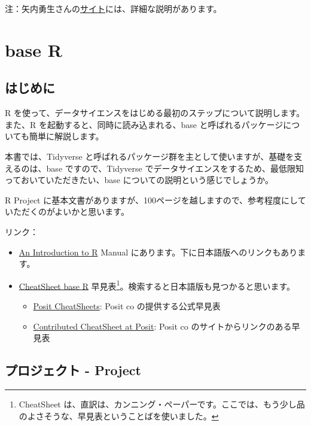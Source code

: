 \documentclass[
  xelatex, ja=standard]{bxjsbook}
\theoremstyle{definition}
\theoremstyle{definition}
\theoremstyle{definition}
\theoremstyle{definition}
\theoremstyle{remark}
\begin{document}
注：矢内勇生さんの\href{https://yukiyanai.github.io/jp/resources/docs/install-R_windows.pdf}{サイト}には、詳細な説明があります。

\hypertarget{rbasics}{%
\chapter{base R}\label{rbasics}}

\hypertarget{ux306fux3058ux3081ux306b-1}{%
\section{はじめに}\label{ux306fux3058ux3081ux306b-1}}

R を使って、データサイエンスをはじめる最初のステップについて説明します。また、R を起動すると、同時に読み込まれる、base と呼ばれるパッケージについても簡単に解説します。

本書では、Tidyverse と呼ばれるパッケージ群を主として使いますが、基礎を支えるのは、base ですので、Tidyverse でデータサイエンスをするため、最低限知っておいていただきたい、base についての説明という感じでしょうか。

R Project に基本文書がありますが、100ページを越しますので、参考程度にしていただくのがよいかと思います。

リンク：

\begin{itemize}
\item
  \href{https://cran.r-project.org/}{An Introduction to R} Manual にあります。下に日本語版へのリンクもあります。
\item
  \href{https://rstudio.github.io/cheatsheets/base-r.pdf}{CheatSheet base R} 早見表\footnote{CheatSheet は、直訳は、カンニング・ペーパーです。ここでは、もう少し品のよさそうな、早見表ということばを使いました。}。検索すると日本語版も見つかると思います。

  \begin{itemize}
  \item
    \href{https://posit.co/resources/cheatsheets/}{Posit CheatSheets}: Posit co の提供する公式早見表
  \item
    \href{https://rstudio.github.io/cheatsheets/contributed-cheatsheets.html}{Contributed CheatSheet at Posit}: Posit co のサイトからリンクのある早見表
  \end{itemize}
\end{itemize}

\hypertarget{ux30d7ux30edux30b8ux30a7ux30afux30c8---project}{%
\section{プロジェクト - Project}\label{ux30d7ux30edux30b8ux30a7ux30afux30c8---project}}
\end{document}
